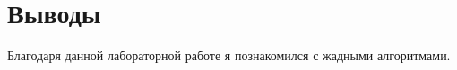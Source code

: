 \section{Выводы}

Благодаря данной лабораторной работе я познакомился с жадными алгоритмами.

\pagebreak
